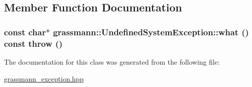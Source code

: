 \subsection{Member Function Documentation}
\hypertarget{classgrassmann_1_1UndefinedSystemException_96dc5afc62b18e147c108dfd76b7a5d7}{
\subsubsection[what]{\setlength{\rightskip}{0pt plus 5cm}const char$\ast$ grassmann::UndefinedSystemException::what () const  throw ()}}
\label{classgrassmann_1_1UndefinedSystemException_96dc5afc62b18e147c108dfd76b7a5d7}




The documentation for this class was generated from the following file:\begin{CompactItemize}
\item 
\hyperlink{grassmann__exception_8hpp}{grassmann\_\-exception.hpp}\end{CompactItemize}
